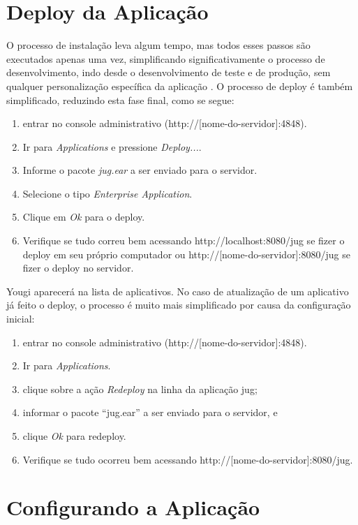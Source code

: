 \documentclass[envcountsame,envcountchap,letterpaper]{svmono}
\begin{document}
\section{Deploy da Aplicação}

O processo de instalação leva algum tempo, mas todos esses passos são executados apenas uma vez, simplificando significativamente o processo de desenvolvimento, indo desde o desenvolvimento de teste e de produção, sem qualquer personalização específica da aplicação . O processo de deploy é também simplificado, reduzindo esta fase final, como se segue:

\begin{enumerate}
\item entrar no console administrativo (http://[nome-do-servidor]:4848).
\item Ir para \textit{Applications} e pressione \textit{Deploy...}.
\item Informe o pacote \textit{jug.ear} a ser enviado para o servidor.
\item Selecione o tipo \textit{Enterprise Application}.
\item Clique em \textit{Ok} para o deploy.
\item Verifique se tudo correu bem acessando http://localhost:8080/jug se fizer o deploy em seu próprio computador ou http://[nome-do-servidor]:8080/jug se fizer o deploy no servidor.
\end{enumerate}

Yougi aparecerá na lista de aplicativos. No caso de atualização de um aplicativo já feito o deploy, o processo é muito mais simplificado por causa da configuração inicial:

\begin{enumerate}
\item entrar no console administrativo (http://[nome-do-servidor]:4848).
\item Ir para \textit{Applications}.
\item clique sobre a ação \textit{Redeploy} na linha da aplicação jug;
\item informar o pacote “jug.ear” a ser enviado para o servidor, e
\item clique \textit{Ok} para redeploy.
\item Verifique se tudo ocorreu bem acessando http://[nome-do-servidor]:8080/jug.
\end{enumerate}

\section{Configurando a Aplicação}
\end{document}
